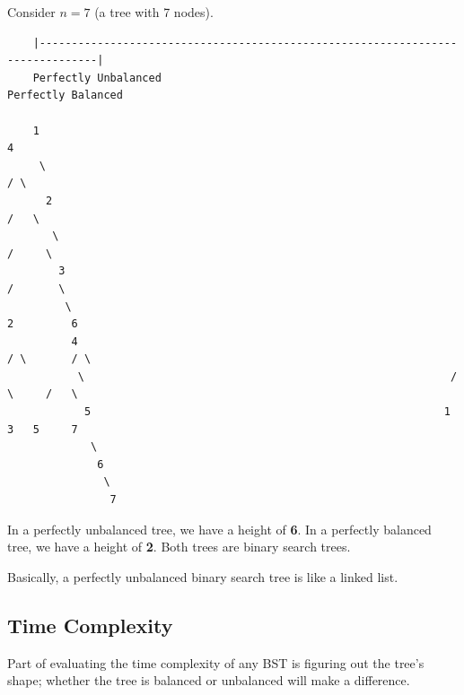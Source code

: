 \documentclass[letterpaper]{article}
\begin{document}
\bigskip 

Consider $n = 7$ (a tree with 7 nodes).
\begin{verbatim}
    |-------------------------------------------------------------------------------|
    Perfectly Unbalanced                                           Perfectly Balanced 

    1                                                                       4
     \                                                                     / \  
      2                                                                   /   \ 
       \                                                                 /     \ 
        3                                                               /       \ 
         \                                                             2         6 
          4                                                           / \       / \  
           \                                                         /   \     /   \  
            5                                                       1     3   5     7 
             \                                             
              6                                           
               \                                          
                7
\end{verbatim}
In a perfectly unbalanced tree, we have a height of \textbf{6}. In a perfectly balanced tree, we have a height of \textbf{2}. Both trees are binary search trees.

\bigskip 

Basically, a perfectly unbalanced binary search tree is like a linked list. 

\subsection{Time Complexity}
Part of evaluating the time complexity of any BST is figuring out the tree's shape; whether the tree is balanced or unbalanced will make a difference. 

\bigskip 
\end{document}
